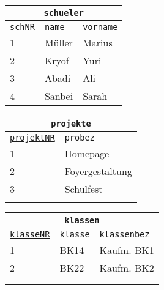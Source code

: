\begin{Answer}[ref=Normal0]
	\begin{minipage}[t]{\textwidth}
		\begin{minipage}{0.33\textwidth}
			\begin{tabular}{lll}
				\multicolumn{3}{c}{\lstinline!schueler!}\\
				\hline
				\underline{\lstinline!schNR!}&\lstinline!name!&\lstinline!vorname!\\
				\hline
				1&Müller&Marius\\
				2&Kryof&Yuri\\
				3&Abadi&Ali\\
				4&Sanbei&Sarah\\
			\end{tabular}
		\end{minipage}
		\begin{minipage}[t]{0.33\textwidth}
			\begin{tabular}{ll}
				\multicolumn{2}{c}{\lstinline!projekte!}\\
				\hline
				\underline{\lstinline!projektNR!}&\lstinline!probez!\\
				\hline
				1&Homepage\\
				2&Foyergestaltung\\
				3&Schulfest\\
				\phantom{text}&\\
			\end{tabular}
		\end{minipage}
		\begin{minipage}[t]{0.33\textwidth}
			\begin{tabular}{lll}
				\multicolumn{3}{c}{\lstinline!klassen!}\\
				\hline
				\underline{\lstinline!klasseNR!}&\lstinline!klasse!&\lstinline!klassenbez!\\
				\hline
				1&BK14&Kaufm. BK1\\
				2&BK22&Kaufm. BK2\\
				\phantom{text}&&\\
				\phantom{text}&&\\
			\end{tabular}
		\end{minipage}
	\end{minipage}
	\begin{minipage}{\textwidth}
		\begin{minipage}{0.33\textwidth}
			\begin{tabular}{ll}

\end{tabular}
\end{minipage}
\end{minipage}
\end{Answer}
